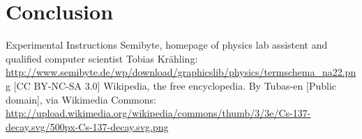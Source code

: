 \documentclass[bigchapter,colorback,accentcolor=tud4b,linedtoc,11pt]{tudreport}
\begin{document}
\chapter{Conclusion}

\cleardoublepage{}
\newpage
\begin{thebibliography}{100}
   {Experimental Instructions}  {Semibyte, homepage of physics lab assistent and qualified
      computer scientist Tobias Krähling:
      \url{http://www.semibyte.de/wp/download/graphicslib/physics/termschema_na22.png}
    [CC BY-NC-SA 3.0]}
   {Wikipedia, the free encyclopedia. By Tubas-en [Public
      domain], via Wikimedia Commons: \url{http://upload.wikimedia.org/wikipedia/commons/thumb/3/3e/Cs-137-decay.svg/500px-Cs-137-decay.svg.png}}
\end{thebibliography}
\end{document}
